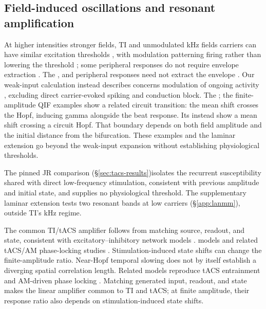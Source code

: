 \documentclass[11pt,a4paper]{article}
\providecommand{\DIFaddtex}[1]{{\protect\color{blue} \sf #1}} %
\providecommand{\DIFdeltex}[1]{{\protect\color{red} \scriptsize #1}} %
\providecommand{\DIFaddbegin}{} %
\providecommand{\DIFaddend}{} %
\providecommand{\DIFdelbegin}{} %
\providecommand{\DIFdelend}{} %
\providecommand{\DIFadd}[1]{\texorpdfstring{\DIFaddtex{#1}}{#1}} %
\providecommand{\DIFdel}[1]{\texorpdfstring{\DIFdeltex{#1}}{}} %
\begin{document}
\DIFaddend \subsection{Field-induced oscillations and resonant amplification}
At \DIFdelbegin \DIFdel{higher intensities}\DIFdelend \DIFaddbegin \DIFadd{stronger fields}\DIFaddend , TI and unmodulated \DIFdelbegin \DIFdel{kHz fields }\DIFdelend \DIFaddbegin \DIFadd{carriers }\DIFaddend can have similar excitation
thresholds \DIFdelbegin \DIFdel{, with modulation patterning firing rather than lowering the threshold
\cite{opancar2025,semenov2025}; some peripheral responses do not
require envelope extraction \cite{peripheral2023}. The }\DIFdelend \DIFaddbegin \DIFadd{\cite{opancar2025,semenov2025}, and peripheral responses need not
extract the envelope \cite{peripheral2023}. Our }\DIFaddend weak-input calculation \DIFdelbegin \DIFdel{instead describes
}\DIFdelend \DIFaddbegin \DIFadd{concerns
}\DIFaddend modulation of ongoing activity \DIFdelbegin \DIFdel{\cite{vieira2024,missey2026}, excluding direct
carrier-evoked spiking and conduction block. The }\DIFdelend \DIFaddbegin \DIFadd{\cite{vieira2024}; the }\DIFaddend finite-amplitude
QIF examples \DIFdelbegin \DIFdel{show a related circuit transition: the mean shift crosses the Hopf, inducing
gamma alongside the beat response. Its }\DIFdelend \DIFaddbegin \DIFadd{instead show a mean shift crossing a circuit Hopf. That }\DIFaddend boundary
depends on \DIFdelbegin \DIFdel{both field amplitude and the initial distance from the bifurcation. These examples and the laminar
extension go beyond the weak-input expansion without establishing physiological thresholds.
}%

\DIFdel{The pinned JR comparison (\S\ref{sec:tacs-results})isolates the recurrent
susceptibility shared with direct low-frequency stimulation, consistent with
previous }\DIFdelend \DIFaddbegin \DIFadd{amplitude and initial state, and supplies no physiological threshold.
The supplementary laminar extension tests two resonant bands at low carriers
(\S\ref{app:lanmm}), outside TI's kHz regime.
}

\DIFadd{The common TI/tACS amplifier follows from matching source, readout, and state,
consistent with }\DIFaddend excitatory--inhibitory \DIFdelbegin \DIFdel{network models \cite{ledoux2011,clusella2023}
.
}\DIFdelend \DIFaddbegin \DIFadd{models \cite{ledoux2011,clusella2023}
and related tACS/AM phase-locking studies
\cite{ali2013,negahbani2018,krause2023}. Stimulation-induced state shifts can
change the finite-amplitude ratio. }\DIFaddend Near-Hopf temporal slowing does not \DIFaddbegin \DIFadd{by itself
}\DIFaddend establish a diverging spatial correlation length. \DIFdelbegin \DIFdel{Related models reproduce tACS entrainment and AM-driven phase locking
\cite{ali2013,negahbani2018,krause2023}. Matching generated input, readout, and state
makes the linear amplifier common to TI and tACS; at finite amplitude, their
response ratio also depends on stimulation-induced state shifts.
}%
\end{document}
